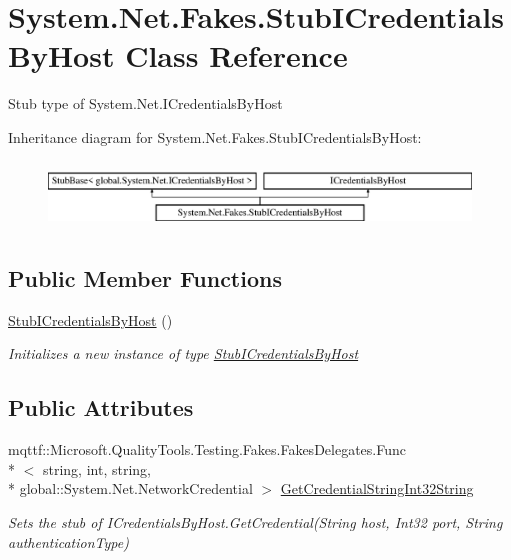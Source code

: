 \hypertarget{class_system_1_1_net_1_1_fakes_1_1_stub_i_credentials_by_host}{\section{System.\-Net.\-Fakes.\-Stub\-I\-Credentials\-By\-Host Class Reference}
\label{class_system_1_1_net_1_1_fakes_1_1_stub_i_credentials_by_host}
}


Stub type of System.\-Net.\-I\-Credentials\-By\-Host 


Inheritance diagram for System.\-Net.\-Fakes.\-Stub\-I\-Credentials\-By\-Host\-:\begin{figure}[H]
\begin{center}
\leavevmode
\includegraphics[height=1.812298cm]{class_system_1_1_net_1_1_fakes_1_1_stub_i_credentials_by_host}
\end{center}
\end{figure}
\subsection*{Public Member Functions}
\begin{DoxyCompactItemize}
\item 
\hyperlink{class_system_1_1_net_1_1_fakes_1_1_stub_i_credentials_by_host_a598f313b54b7a421263baf52859b0b12}{Stub\-I\-Credentials\-By\-Host} ()
\begin{DoxyCompactList}\small\item\em Initializes a new instance of type \hyperlink{class_system_1_1_net_1_1_fakes_1_1_stub_i_credentials_by_host}{Stub\-I\-Credentials\-By\-Host}\end{DoxyCompactList}\end{DoxyCompactItemize}
\subsection*{Public Attributes}
\begin{DoxyCompactItemize}
\item 
mqttf\-::\-Microsoft.\-Quality\-Tools.\-Testing.\-Fakes.\-Fakes\-Delegates.\-Func\\*
$<$ string, int, string, \\*
global\-::\-System.\-Net.\-Network\-Credential $>$ \hyperlink{class_system_1_1_net_1_1_fakes_1_1_stub_i_credentials_by_host_a32f97470111bd506107adfaf8abe2a60}{Get\-Credential\-String\-Int32\-String}
\begin{DoxyCompactList}\small\item\em Sets the stub of I\-Credentials\-By\-Host.\-Get\-Credential(\-String host, Int32 port, String authentication\-Type)\end{DoxyCompactList}\end{DoxyCompactItemize}


